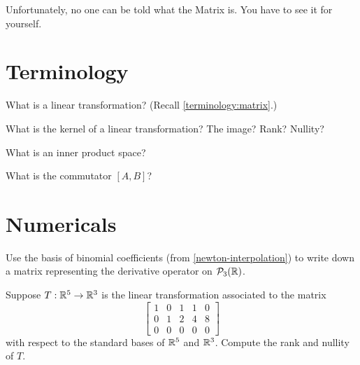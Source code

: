 \documentclass{homework}
\author{Jim Fowler}
\begin{document}
\maketitle

\begin{inspiration}
Unfortunately, no one can be told what the Matrix is. You have to see it for yourself.
\end{inspiration}

\section{Terminology}

\begin{problem}
  What is  a linear transformation?  (Recall \ref{terminology:matrix}.)
\end{problem}

\begin{problem}
  What is the kernel of a linear transformation?  The image?  Rank?  Nullity?
\end{problem}

\begin{problem}
  What is an inner product space?
\end{problem}

\begin{problem}
  What is the commutator $[A,B]$?
\end{problem}

\section{Numericals}

\begin{problem}
  Use the basis of binomial coefficients (from
  \ref{newton-interpolation}) to write down a matrix representing the
  derivative operator on $\mathcal{P}_{3}(\mathbb{R})$.
\end{problem}

\begin{problem}
  Suppose $T : \mathbb{R}^5 \to \mathbb{R}^3$ is the linear transformation associated to the matrix
  \[\begin{bmatrix}
    1 & 0 & 1 & 1 & 0 \\
    0 & 1 & 2 & 4 & 8 \\
    0 & 0 & 0 & 0 & 0
  \end{bmatrix}\]
  with respect to the standard bases of $\mathbb{R}^5$ and $\mathbb{R}^3$.  Compute the rank and nullity of $T$.
\end{problem}
\end{document}
